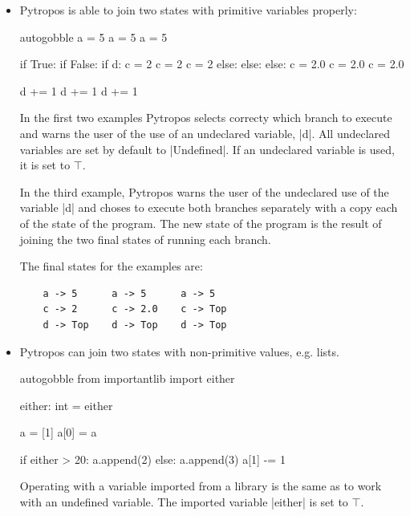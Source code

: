 \begin{itemize}
\tightlist
\item Pytropos is able to join two states with primitive variables properly:

  \begin{pythoncode*}{autogobble}
  a = 5               a = 5               a = 5

  if True:            if False:           if d:
      c = 2               c = 2               c = 2
  else:               else:               else:
      c = 2.0             c = 2.0             c = 2.0

  d += 1              d += 1              d += 1
  \end{pythoncode*}

  In the first two examples Pytropos selects correcty which branch to execute and warns
  the user of the use of an undeclared variable, \pycode|d|.  All undeclared variables are
  set by default to \pycode|Undefined|. If an undeclared variable is used, it is set to
  $\top$.

  In the third example, Pytropos warns the user of the undeclared use of the variable
  \pycode|d| and choses to execute both branches separately with a copy each of the state
  of the program. The new state of the program is the result of joining the two final
  states of running each branch.

  The final states for the examples are:

  \begin{verbatim}
    a -> 5      a -> 5      a -> 5
    c -> 2      c -> 2.0    c -> Top
    d -> Top    d -> Top    d -> Top
  \end{verbatim}

\item Pytropos can join two states with non-primitive values, e.g. lists.

  \begin{pythoncode*}{autogobble}
    from importantlib import either

    either: int = either

    a = [1]
    a[0] = a

    if either > 20:
      a.append(2)
    else:
      a.append(3)
      a[1] -= 1
  \end{pythoncode*}

  Operating with a variable imported from a library is the same as to work with an
  undefined variable. The imported variable \pycode|either| is set to $\top$.


\end{itemize}
